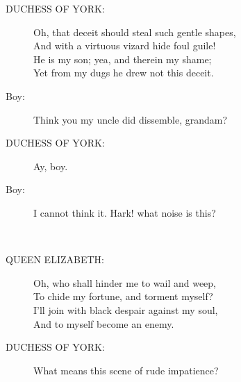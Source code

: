 \documentclass{article}
\begin{document}
\begin{description}
\item[DUCHESS OF YORK:] 
\hspace{1pt}Oh, that deceit should steal such gentle shapes,\\
\hspace{1pt}And with a virtuous vizard hide foul guile!\\
\hspace{1pt}He is my son; yea, and therein my shame;\\
\hspace{1pt}Yet from my dugs he drew not this deceit.\\
\end{description}
\begin{description}
\item[Boy:] 
\hspace{1pt}Think you my uncle did dissemble, grandam?\\
\end{description}
\begin{description}
\item[DUCHESS OF YORK:] 
\hspace{1pt}Ay, boy.\\
\end{description}
\begin{description}
\item[Boy:] 
\hspace{1pt}I cannot think it. Hark! what noise is this?\\
\end{description}
\\
\begin{description}
\item[QUEEN ELIZABETH:] 
\hspace{1pt}Oh, who shall hinder me to wail and weep,\\
\hspace{1pt}To chide my fortune, and torment myself?\\
\hspace{1pt}I'll join with black despair against my soul,\\
\hspace{1pt}And to myself become an enemy.\\
\end{description}
\begin{description}
\item[DUCHESS OF YORK:] 
\hspace{1pt}What means this scene of rude impatience?\\
\end{description}
\end{document}
